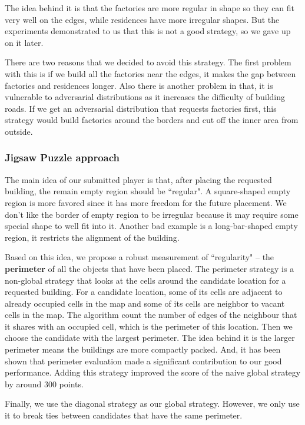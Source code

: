 The idea behind it is that the factories are more regular in shape so they can fit very well on the edges, while residences have more irregular shapes. But the experiments demonstrated to us that this is not a good strategy, so we gave up on it later. 

There are two reasons that we decided to avoid this strategy. The first problem with this is if we build all the factories near the edges, it makes the gap between factories and residences longer. Also there is another problem in that, it is vulnerable to adversarial distributions as it increases the difficulty of building roads. If we get an adversarial distribution that requests factories first, this strategy would build factories around the borders and cut off the inner area from outside. 

\subsubsection{Jigsaw Puzzle approach}
The main idea of our submitted player is that, after placing the requested building, the remain empty region should be ``regular". A square-shaped empty region is more favored since it has more freedom for the future placement. We don't like the border of empty region to be irregular because it may require some special shape to well fit into it. Another bad example is a long-bar-shaped empty region, it restricts the alignment of the building.

Based on this idea, we propose a robust measurement of ``regularity" -- the {\bf perimeter} of all the objects that have been placed.
The perimeter strategy is a non-global strategy that looks at the cells around the candidate location for a requested building. For a candidate location, some of its cells are adjacent to already occupied cells in the map and some of its cells are neighbor to vacant cells in the map. The algorithm count the number of edges of the neighbour that it shares with an occupied cell, which is the perimeter of this location. Then we choose the candidate with the largest perimeter. The idea behind it is the larger perimeter means the buildings are more compactly packed. And, it has been shown that perimeter evaluation made a significant contribution to our good performance. Adding this strategy improved the score of the naive global strategy by around 300 points. 

Finally, we use the diagonal strategy as our global strategy. However, we only use it to break ties between candidates that have the same perimeter.\\

